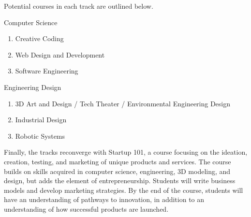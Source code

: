 Potential courses in each track are outlined below.\par
Computer Science
\begin{enumerate}
	\item Creative Coding
	\item Web Design and Development
	\item Software Engineering
\end{enumerate}
Engineering Design
\begin{enumerate}
	\item 3D Art and Design / Tech Theater / Environmental Engineering Design 
	\item Industrial Design
	\item Robotic Systems
\end{enumerate}	

Finally, the tracks reconverge with Startup 101, a course focusing on the ideation, creation, testing, and marketing of unique products and services. The course builds on skills acquired in computer science, engineering, 3D modeling, and design, but adds the element of entrepreneurship. Students will write business models and develop marketing strategies. By the end of the course, students will have an understanding of pathways to innovation, in addition to an understanding of how successful products are launched.\par

